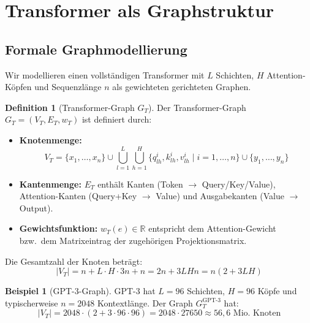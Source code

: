 ﻿\documentclass[a4paper,12pt]{article}
\theoremstyle{definition}
\newtheorem{definition}{Definition}
\newtheorem{beispiel}{Beispiel}
\begin{document}
\section{Transformer als Graphstruktur}

\subsection{Formale Graphmodellierung}

Wir modellieren einen vollständigen Transformer mit $L$ Schichten, $H$
Attention-Köpfen und Sequenzlänge $n$ als gewichteten gerichteten Graphen.

\begin{definition}[Transformer-Graph $G_T$]
	Der Transformer-Graph $G_T = (V_T, E_T, w_T)$ ist definiert durch:
	\begin{itemize}
		\item \textbf{Knotenmenge:}
		\[
		V_T = \{x_1,\ldots,x_n\} \cup \bigcup_{l=1}^{L}\bigcup_{h=1}^{H}
		\{q_{lh}^i, k_{lh}^i, v_{lh}^i \mid i=1,\ldots,n\}
		\cup \{y_1,\ldots,y_n\}
		\]
		\item \textbf{Kantenmenge:} $E_T$ enthält Kanten
		      (Token $\to$ Query/Key/Value), Attention-Kanten
		      (Query+Key $\to$ Value) und Ausgabekanten (Value $\to$ Output).
		\item \textbf{Gewichtsfunktion:} $w_T(e) \in \mathbb{R}$ entspricht
		      dem Attention-Gewicht bzw.\ dem Matrixeintrag der zugehörigen
		      Projektionsmatrix.
	\end{itemize}
\end{definition}

Die Gesamtzahl der Knoten beträgt:
\[
|V_T| = n + L \cdot H \cdot 3n + n = 2n + 3LHn = n(2 + 3LH)
\]

\begin{beispiel}[GPT-3-Graph]
	GPT-3 hat $L = 96$ Schichten, $H = 96$ Köpfe und typischerweise
	$n = 2048$ Kontextlänge. Der Graph $G_{T}^{\mathrm{GPT\text{-}3}}$ hat:
	\[
	|V_T| = 2048 \cdot (2 + 3 \cdot 96 \cdot 96) = 2048 \cdot 27650 \approx 56{,}6 \text{ Mio.\ Knoten}
	\]
\end{beispiel}
\end{document}
